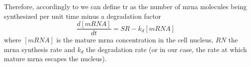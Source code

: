 Therefore, accordingly to \cite{what_is_tr} we can define \gls{tr} as the number of \gls{mrna} molecules being synthesized per unit time minus a degradation factor
\begin{equation}
  \frac{d[mRNA]}{dt} = SR - k_d [mRNA]
\end{equation}
\noindent where $[mRNA]$ is the mature \gls{mrna} concentration in the cell nucleus, $RN$ the \gls{mrna} synthesis rate and $k_d$ the degradation rate (or in our case, the rate at which mature \gls{mrna} escapes the nucleus).

